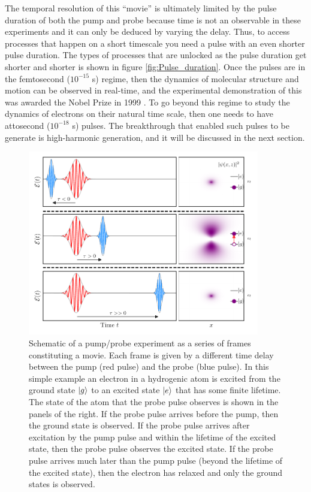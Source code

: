 The temporal resolution of this ``movie'' is ultimately limited by the pulse duration of both the pump and probe because time is not an observable in these experiments and it can only be deduced by varying the delay.  Thus, to access processes that happen on a short timescale you need a pulse with an even shorter pulse duration.  The types of processes that are unlocked as the pulse duration get shorter and shorter is shown in figure \ref{fig:Pulse_duration}.  Once the pulses are in the femtosecond ($10^{-15}$ s) regime, then the dynamics of molecular structure and motion can be observed in real-time, and the experimental demonstration of this was awarded the Nobel Prize in 1999 \cite{zewailLaserFemtochemistry1988}.  To go beyond this regime to study the dynamics of electrons on their natural time scale, then one needs to have attosecond ($10^{-18}$ s) pulses.  The breakthrough that enabled such pulses to be generate is high-harmonic generation, and it will be discussed in the next section.

\begin{figure}
	\centering
	\includegraphics[width=0.9\textwidth]{figures/Introduction/pump_probe.pdf}
	\caption[Schematic of as pump/probe experiment]{Schematic of a pump/probe experiment as a series of frames constituting a movie.  Each frame is given by a different time delay between the pump (red pulse) and the probe (blue pulse).  In this simple example an electron in a hydrogenic atom is excited from the ground state $\ket{g}$ to an excited state $\ket{e}$ that has some finite lifetime.  The state of the atom that the probe pulse observes is shown in the panels of the right.  If the probe pulse arrives before the pump, then the ground state is observed.  If the probe pulse arrives after excitation by the pump pulse and within the lifetime of the excited state, then the probe pulse observes the excited state.  If the probe pulse arrives much later than the pump pulse (beyond the lifetime of the excited state), then the electron has relaxed and only the ground states is observed.}
	\label{fig:pump_probe}
\end{figure}

